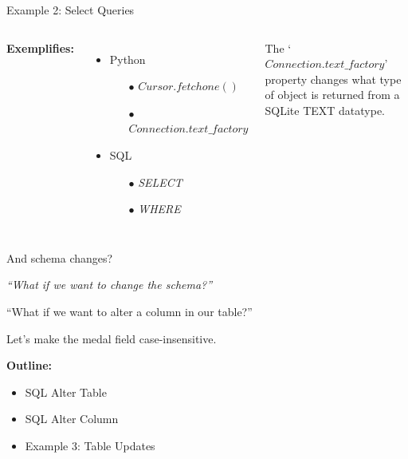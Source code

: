 \documentclass{beamer}
\begin{document}
\begin{frame}{Example 2: Select Queries}

\begin{columns}
 \scriptsize

{\bf Exemplifies:}
\begin{itemize} \setlength\itemindent{-5pt}%
	\item Python
	\begin{itemize} \setlength\itemindent{-20pt} \scriptsize
		\item[$\bullet$] $Cursor.fetchone()$
		\item[$\bullet$] $Connection.text\_factory$
	\end{itemize}
	\item SQL
	\begin{itemize} \setlength\itemindent{-20pt} \scriptsize
		\item[$\bullet$] \textit{SELECT}
		\item[$\bullet$] \textit{WHERE}
	\end{itemize}
\end{itemize}

\vspace{12pt} The `$Connection.text\_factory$' property changes what type of object is returned from a SQLite TEXT datatype.



\end{columns}

\end{frame}
\begin{frame}{And schema changes?}

\textit{``What if we want to change the schema?''}

\vspace{3pt}\hspace{.5cm} ``What if we want to alter a column in our table?''

\vspace{12pt}\hspace{2.5cm} Let's make the medal field case-insensitive.

\vspace{12pt}
\large {\bf Outline:}
\begin{itemize}
\item SQL Alter Table
\item SQL Alter Column
\item Example 3: Table Updates
\end{itemize}

\end{frame}
\end{document}
